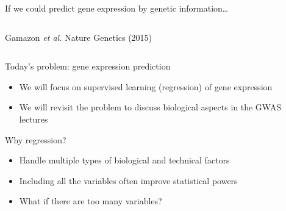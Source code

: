 \documentclass[
  ignorenonframetext,
  aspectratio=169]{beamer}
\begin{document}
\begin{frame}{If we could predict gene expression by genetic
information\ldots{}}
\begin{columns}[T]
\begin{column}{.45\textwidth}
{}

\normalsize

\tiny Gamazon \emph{et al.} Nature Genetics (2015)
\end{column}
\end{columns}
\end{frame}

\begin{frame}{Today's problem: gene expression prediction}
\protect\hypertarget{todays-problem-gene-expression-prediction}{}
\large

\begin{itemize}
\item
  We will focus on supervised learning (regression) of gene expression
\item
  We will revisit the problem to discuss biological aspects in the GWAS
  lectures
\end{itemize}
\end{frame}

\begin{frame}{Why regression?}
\protect\hypertarget{why-regression}{}
\scriptsize


\normalsize

\begin{itemize}
\item
  Handle multiple types of biological and technical factors
\item
  Including all the variables often improve statistical powers
\item
  What if there are too many variables?
\end{itemize}

\vfill

\end{frame}
\end{document}
